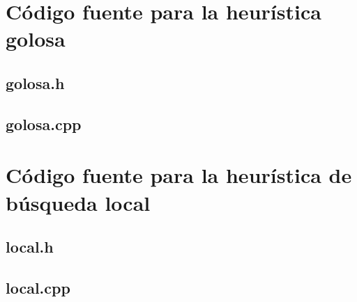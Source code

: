 \documentclass[a4paper, 10pt, twoside]{article}
\begin{document}


\newpage

\section{Código fuente para la heurística golosa}


\subsection{golosa.h}




\subsection{golosa.cpp}






\newpage

\section{Código fuente para la heurística de búsqueda local}


\subsection{local.h}




\subsection{local.cpp}




\end{document}
